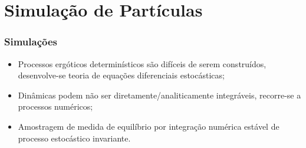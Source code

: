 
\section{Simulação de Partículas}

\begin{frame}
	\frametitle{Simulações}
	
	\begin{itemize}
		\item Processos ergóticos determinísticos são difíceis de serem construídos, desenvolve-se teoria de equações diferenciais estocásticas;
		\pause
		\item Dinâmicas podem não ser diretamente/analiticamente integráveis, recorre-se a processos numéricos;
		\pause
		\item Amostragem de medida de equilíbrio por integração numérica estável de processo estocástico invariante.
	\end{itemize}
\end{frame}

